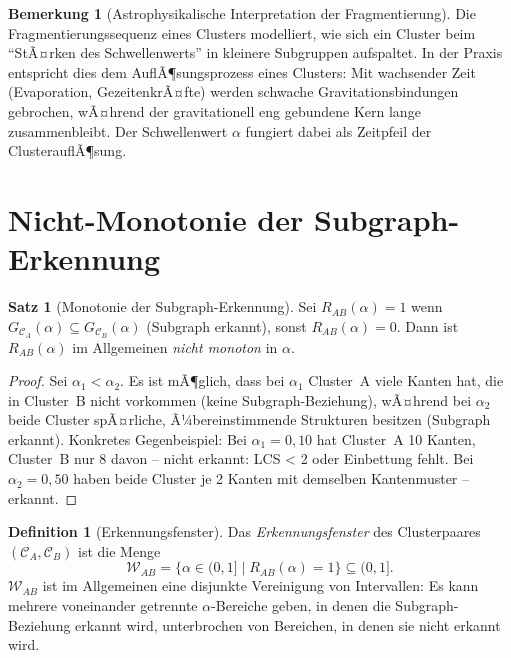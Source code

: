 ﻿\documentclass[a4paper,12pt]{report}
\theoremstyle{definition}
\newtheorem{definition}{Definition}
\newtheorem{satz}{Satz}
\newtheorem{bemerkung}{Bemerkung}
\begin{document}
\begin{bemerkung}[Astrophysikalische Interpretation der Fragmentierung]
Die Fragmentierungssequenz eines Clusters modelliert, wie sich ein Cluster beim ``StÃ¤rken des Schwellenwerts'' in kleinere Subgruppen aufspaltet. In der Praxis entspricht dies dem AuflÃ¶sungsprozess eines Clusters: Mit wachsender Zeit (Evaporation, GezeitenkrÃ¤fte) werden schwache Gravitationsbindungen gebrochen, wÃ¤hrend der gravitationell eng gebundene Kern lange zusammenbleibt. Der Schwellenwert $\alpha$ fungiert dabei als Zeitpfeil der ClusterauflÃ¶sung.
\end{bemerkung}

\section{Nicht-Monotonie der Subgraph-Erkennung}
\label{sec:nichtmonotonie}

\begin{satz}[Monotonie der Subgraph-Erkennung]
\label{satz:nicht_monotonie}
Sei $R_{AB}(\alpha) = 1$ wenn $G_{\mathcal{C}_A}(\alpha) \subseteq G_{\mathcal{C}_B}(\alpha)$ (Subgraph erkannt), sonst $R_{AB}(\alpha) = 0$. Dann ist $R_{AB}(\alpha)$ im Allgemeinen \emph{nicht monoton} in $\alpha$.
\end{satz}

\begin{proof}
Sei $\alpha_1 < \alpha_2$. Es ist mÃ¶glich, dass bei $\alpha_1$ Cluster~A viele Kanten hat, die in Cluster~B nicht vorkommen (keine Subgraph-Beziehung), wÃ¤hrend bei $\alpha_2$ beide Cluster spÃ¤rliche, Ã¼bereinstimmende Strukturen besitzen (Subgraph erkannt). Konkretes Gegenbeispiel: Bei $\alpha_1 = 0{,}10$ hat Cluster~A 10 Kanten, Cluster~B nur 8 davon -- nicht erkannt: LCS < 2 oder Einbettung fehlt. Bei $\alpha_2 = 0{,}50$ haben beide Cluster je 2 Kanten mit demselben Kantenmuster -- erkannt.
\end{proof}

\begin{definition}[Erkennungsfenster]
\label{def:erkennungsfenster}
Das \emph{Erkennungsfenster} des Clusterpaares $(\mathcal{C}_A, \mathcal{C}_B)$ ist die Menge
\[
\mathcal{W}_{AB} = \{\alpha \in (0,1] \mid R_{AB}(\alpha) = 1\} \subseteq (0,1].
\]
$\mathcal{W}_{AB}$ ist im Allgemeinen eine disjunkte Vereinigung von Intervallen: Es kann mehrere voneinander getrennte $\alpha$-Bereiche geben, in denen die Subgraph-Beziehung erkannt wird, unterbrochen von Bereichen, in denen sie nicht erkannt wird.
\end{definition}
\end{document}
